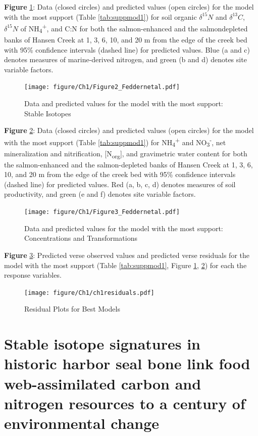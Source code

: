 \documentclass [11pt, proquest] {uwthesis}[2015/03/03]
\begin{document}
\textbf{Figure} \ref{fig:modIsotope}: Data (closed circles) and predicted values (open circles) for the model with the most support (Table \ref{tab:suppmod1}) for soil organic \(\delta^{15}N\) and \(\delta^{13}C\), \(\delta^{15}N\) of NH\textsubscript{4}\textsuperscript{+}, and C:N for both the salmon-enhanced and the salmondepleted banks of Hansen Creek at 1, 3, 6, 10, and 20 m from the edge of the creek bed with 95\% confidence intervals (dashed line) for predicted values. Blue (a and c) denotes measures of marine-derived nitrogen, and green (b and d) denotes site variable factors.\newline
\begin{figure}[h]
  \texttt{[image: figure/Ch1/Figure2\_Feddernetal.pdf]}
  \caption{Data and predicted values for the model with the most support: Stable Isotopes}
  \label{fig:modIsotope}
\end{figure}
\clearpage

\textbf{Figure} \ref{fig:modConc}: Data (closed circles) and predicted values (open circles) for the model with the most support (Table \ref{tab:suppmod1}) for NH\textsubscript{4}\textsuperscript{+} and NO\textsubscript{3}\textsuperscript{-}, net mineralization and nitrification, {[}N\textsubscript{org}{]}, and gravimetric water content for both the salmon-enhanced and the salmon-depleted banks of Hansen Creek at 1, 3, 6, 10, and 20 m from the edge of the creek bed with 95\% confidence intervals (dashed line) for predicted values. Red (a, b, c, d) denotes measures of soil productivity, and green (e and f) denotes site variable factors.\newline 
\begin{figure}[h]
  \texttt{[image: figure/Ch1/Figure3\_Feddernetal.pdf]}
  \caption{Data and predicted values for the model with the most support: Concentrations and Transformations}
  \label{fig:modConc}
\end{figure}
\clearpage

\textbf{Figure} \ref{fig:ch1resid}: Predicted verse observed values and predicted verse residuals for the model with the most support (Table \ref{tab:suppmod1}, Figure \ref{fig:modIsotope}, \ref{fig:modConc}) for each the response variables. \newline 
\begin{figure}[h]
  \texttt{[image: figure/Ch1/ch1residuals.pdf]}
  \caption{Residual Plots for Best Models}
  \label{fig:ch1resid}
\end{figure}
\hypertarget{stable-isotope-signatures-in-historic-harbor-seal-bone-link-food-web-assimilated-carbon-and-nitrogen-resources-to-a-century-of-environmental-change}{%
\chapter{Stable isotope signatures in historic harbor seal bone link food web-assimilated carbon and nitrogen resources to a century of environmental change}\label{stable-isotope-signatures-in-historic-harbor-seal-bone-link-food-web-assimilated-carbon-and-nitrogen-resources-to-a-century-of-environmental-change}}
\end{document}
